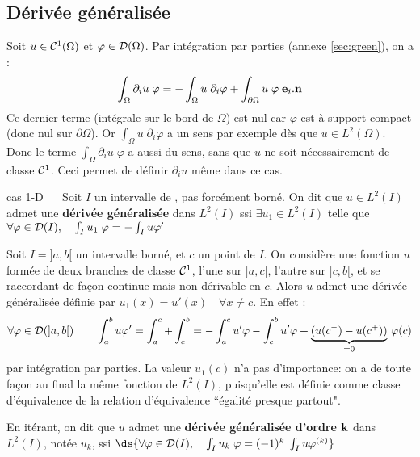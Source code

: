 \subsection{D\'eriv\'ee g\'en\'eralis\'ee}
\label{sec:derivee-generalisee}
%
%
\noindent
Soit $u\in {\cal C}^1(\Omega)$ et $\varphi \in {\cal D}(\Omega)$. Par int\'egration par parties (\cf annexe \ref{sec:green}), on a :
$$
\int_\Omega \partial_i u\;  \varphi = - \int_\Omega u \; \partial_i\varphi + \int_{\partial \Omega} u \; \varphi \; {\bf e}_i.{\bf n}
$$
%
%
Ce dernier terme (int\'egrale sur le bord de $\Omega$) est nul car $\varphi$
est \`a support compact (donc nul sur $\partial \Omega$). Or $\int_\Omega u
\; \partial_i\varphi$ a un sens par exemple d\`es que $u\in L^2(\Omega)$. Donc
le terme $\int_\Omega \partial_i u\; \varphi$ a aussi du sens, sans que $u$ ne
soit n\'ecessairement de classe ${\cal C}^1$. Ceci permet de d\'efinir
$\partial_i u$ m\^eme dans ce cas.
%
\begin{definition}{cas 1-D}
  $\quad$ Soit $I$ un intervalle de \RR, pas forc\'ement born\'e. On
  dit que $u\in L^2(I)$ admet une {\bf d\'eriv\'ee g\'en\'eralis\'ee} dans
  $L^2(I)$ ssi $\exists u_1\in L^2(I)$ telle que $\forall \varphi\in {\cal
  D}(I), \quad \int_I u_1\;\varphi = - \int_I u \varphi'$\label{def:12}
\end{definition}

%
\begin{example}
  Soit $I=]a,b[$ un intervalle born\'e, et $c$ un point de $I$. On consid\`ere
  une fonction $u$ form\'ee de deux branches de classe ${\cal C}^1$, l'une sur
  $]a,c[$, l'autre sur $]c,b[$, et se raccordant de fa\c{c}on continue mais
  non d\'erivable en $c$. Alors $u$ admet une d\'eriv\'ee g\'en\'eralis\'ee
  d\'efinie par $u_1(x)=u'(x)\quad \forall x\ne c$. En effet :
$$
\forall \varphi\in {\cal D}(]a,b[)\qquad \int_a^b u \varphi' = \int_a^c +
\int_c^b = - \int_a^c u' \varphi - \int_c^b u'\varphi +
\underbrace{(u(c^-)-u(c^+))}_{=0} \, \varphi(c)
$$
par int\'egration par parties. La valeur $u_1(c)$ n'a pas d'importance: on a
de toute fa\c{c}on au final la m\^eme fonction de $L^2(I)$, puisqu'elle est
d\'efinie comme classe d'\'equivalence de la relation d'\'equivalence
``\'egalit\'e presque partout".
\end{example}

%
\begin{definition}
  En it\'erant, on dit que $u$ admet une {\bf d\'eriv\'ee g\'en\'eralis\'ee
  d'ordre $\bf k$} dans $L^2(I)$, not\'ee $u_k$, ssi $\ds{\forall \varphi\in
  {\cal D}(I), \quad \int_I u_k\;\varphi = (- 1)^k \; \int_I u \varphi^{(k)}
  }$\label{def:13}
\end{definition}

